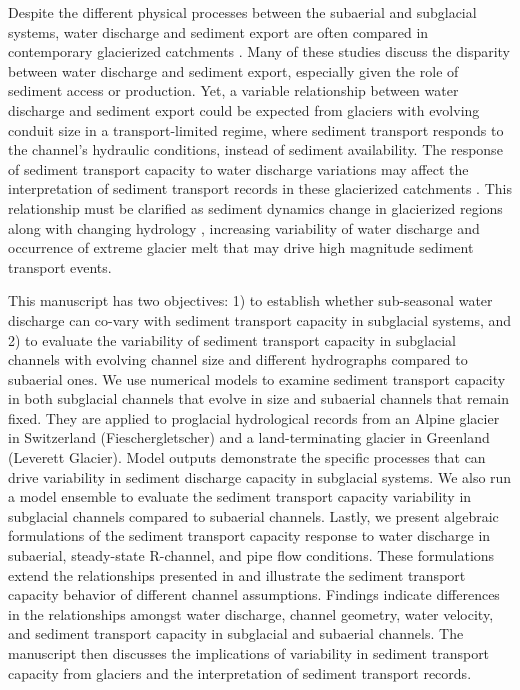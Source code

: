 \documentclass[tc, manuscript]{copernicus}
\begin{document}
Despite the different physical processes between the subaerial and subglacial systems,  water discharge and sediment export are often compared in contemporary glacierized catchments \citep[e.g.][]{willis1996,hodson1998,pearce2003,richards2003,swift2005,chu2009,tedstone2012,chu2012,overeem2017,delaney2018,swift2021,lu2022,andresen2024}.
Many of these studies discuss the disparity between water discharge and sediment export, especially given the role of sediment access or production.
Yet, a variable relationship between water discharge and sediment export could be expected from glaciers with evolving conduit size in a transport-limited regime, where sediment transport responds to the channel's hydraulic conditions, instead of sediment availability.
The response of sediment transport capacity to water discharge variations may affect the interpretation of sediment transport records in these glacierized catchments \citep[e.g.][]{ganti2016,mancini2023}.
This relationship must be clarified as sediment dynamics change in glacierized regions along with changing hydrology \citep[e.g.][]{brunner2019}, increasing variability of water discharge \citep{lane2019b} and occurrence of extreme glacier melt  \citep[e.g.][]{overeem2015,cremona2023} that may drive high magnitude sediment transport events.

This manuscript has two objectives: 1)  to establish whether sub-seasonal water discharge can co-vary with sediment transport capacity in subglacial systems, and 2) to evaluate the variability of sediment transport capacity in subglacial channels with evolving channel size and different hydrographs compared to subaerial ones.
We use numerical models to examine sediment transport capacity in both subglacial channels that evolve in size and subaerial channels that remain fixed.
They are applied to proglacial hydrological records from an Alpine glacier in Switzerland (Fieschergletscher) and a land-terminating glacier in Greenland (Leverett Glacier).
Model outputs demonstrate the specific processes that can drive variability in sediment discharge capacity in subglacial systems.
We also run a model ensemble to evaluate the sediment transport capacity variability in subglacial channels compared to subaerial channels.
Lastly, we present algebraic formulations of the sediment transport capacity response to water discharge in subaerial, steady-state R-channel, and pipe flow conditions.
These formulations extend the relationships presented in \citet{alley1997} and illustrate the sediment transport capacity behavior of different channel assumptions.
Findings indicate differences in the relationships amongst water discharge, channel geometry, water velocity, and sediment transport capacity in subglacial and subaerial channels.
The manuscript then discusses the implications of variability in sediment transport capacity from glaciers and the interpretation of sediment transport records.
\end{document}

